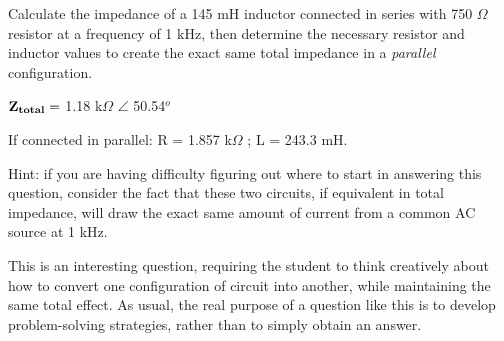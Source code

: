 

Calculate the impedance of a 145 mH inductor connected in series with 750 $\Omega$ resistor at a frequency of 1 kHz, then determine the necessary resistor and inductor values to create the exact same total impedance in a {\it parallel} configuration.







${\bf Z_{total}} =$ 1.18 k$\Omega$ $\angle$ 50.54$^{o}$

\vskip 10pt

If connected in parallel: R = 1.857 k$\Omega$ ; L = 243.3 mH.

\vskip 10pt

Hint: if you are having difficulty figuring out where to start in answering this question, consider the fact that these two circuits, if equivalent in total impedance, will draw the exact same amount of current from a common AC source at 1 kHz.







This is an interesting question, requiring the student to think creatively about how to convert one configuration of circuit into another, while maintaining the same total effect.  As usual, the real purpose of a question like this is to develop problem-solving strategies, rather than to simply obtain an answer.




